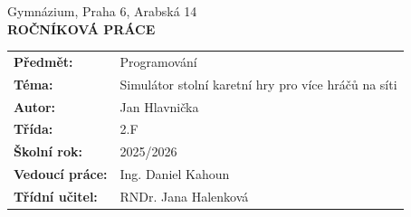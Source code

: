 \thispagestyle{empty}


\begin{center}
    {\large Gymnázium, Praha 6, Arabská 14} \\
    \vspace{1cm}
    {\huge \textbf{ROČNÍKOVÁ PRÁCE}}
\end{center}

\vfill  
 

{
 \fontsize{17}{37}\selectfont
 \renewcommand{\arraystretch}{1.0} 
 \noindent
 \begin{tabularx}{\textwidth}{@{}l X@{}}
    \textbf{Předmět:}       & Programování \\
    \textbf{Téma:}          & Simulátor stolní karetní hry pro více hráčů na síti \\
    \textbf{Autor:}         & Jan Hlavnička \\
    \textbf{Třída:}         & 2.F \\
    \textbf{Školní rok:}    & 2025/2026 \\
    \textbf{Vedoucí práce:}  & Ing. Daniel Kahoun \\
    \textbf{Třídní učitel:}  & RNDr. Jana Halenková \\
 \end{tabularx}
}